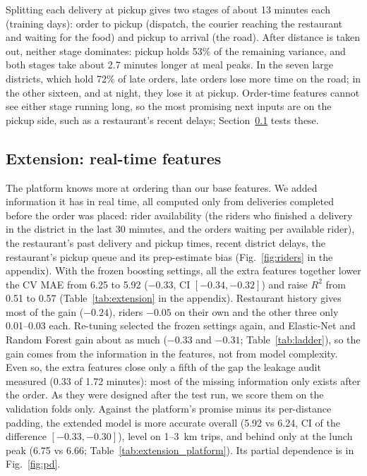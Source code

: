 Splitting each delivery at pickup gives two stages of about 13 minutes each (training days): order to
pickup (dispatch, the courier reaching the restaurant and waiting for the food) and pickup to arrival
(the road). After distance is taken out, neither stage dominates: pickup holds 53\% of the remaining
variance, and both stages take about 2.7 minutes longer at meal peaks. In the seven large districts,
which hold 72\% of late orders, late orders lose more time on the road; in the other sixteen, and at
night, they lose it at pickup. Order-time features cannot see either stage running long, so the most
promising next inputs are on the pickup side, such as a restaurant's recent delays;
Section~\ref{sec:extension} tests these.

\subsection{Extension: real-time features}
\label{sec:extension}
The platform knows more at ordering than our base features. We added information it has in real time, all
computed only from deliveries completed before the order was placed: rider availability (the riders who
finished a delivery in the district in the last 30 minutes, and the orders waiting per available rider),
the restaurant's past delivery and pickup times, recent district delays, the restaurant's pickup queue and
its prep-estimate bias (Fig.~\ref{fig:riders} in the appendix). With the frozen boosting settings, all the
extra features together lower the CV MAE from 6.25 to 5.92 ($-0.33$, CI $[-0.34, -0.32]$) and raise $R^2$
from 0.51 to 0.57 (Table~\ref{tab:extension} in the appendix). Restaurant history gives most of the gain
($-0.24$), riders $-0.05$ on their own and the other three only 0.01--0.03 each. Re-tuning selected the
frozen settings again, and Elastic-Net and Random Forest gain about as much ($-0.33$ and $-0.31$;
Table~\ref{tab:ladder}), so the gain comes from the information in the features, not from model
complexity. Even so, the extra features close only a fifth of the gap the leakage audit measured (0.33
of 1.72 minutes): most of the missing information only exists after the order. As they were designed
after the test run, we score them on the validation folds only. Against the platform's promise minus its
per-distance padding, the extended model is more accurate overall (5.92 vs 6.24, CI of the difference
$[-0.33, -0.30]$), level on 1--3~km trips, and behind only at the lunch peak (6.75 vs 6.66;
Table~\ref{tab:extension_platform}). Its partial dependence is in Fig.~\ref{fig:pd}.

